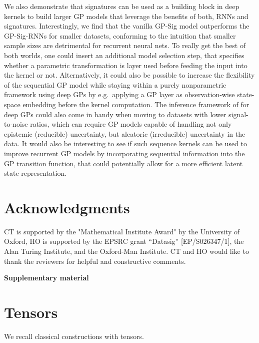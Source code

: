 \documentclass{article}
\begin{document}
We also demonstrate that signatures can be used as a building block in deep kernels to build larger GP models that leverage the benefits of both, RNNs and signatures. Interestingly, we find that the vanilla GP-Sig model outperforms the GP-Sig-RNNs for smaller datasets, conforming to the intuition that smaller sample sizes are detrimental for recurrent neural nets. To really get the best of both worlds, one could insert an additional model selection step, that specifies whether a parametric transformation is layer used before feeding the input into the kernel or not. Alternatively, it could also be possible to increase the flexibility of the sequential GP model while staying within a purely nonparametric framework using deep GPs \cite{damianou2013deep} by e.g.~applying a GP layer as observation-wise state-space embedding before the kernel computation. The inference framework of \cite{salimbeni19deep} for deep GPs could also come in handy when moving to datasets with lower signal-to-noise ratios, which can require GP models capable of handling not only epistemic (reducible) uncertainty, but aleatoric (irreducible) uncertainty in the data. It would also be interesting to see if such sequence kernels can be used to improve recurrent GP models \cite{Mattos2016Recurrent, Ialongo2019Overcoming} by incorporating sequential information into the GP transition function, that could potentially allow for a more efficient latent state representation.





	
	
\section*{Acknowledgments}
CT is supported by the "Mathematical Institute Award" by the University of Oxford, HO is supported by the EPSRC grant “Datasig” [EP/S026347/1], the Alan Turing Institute, and the Oxford-Man Institute.
CT and HO would like to thank the reviewers for helpful and constructive comments.





\appendix








	\newpage 
	\clearpage
	
    \textbf{\large Supplementary material}
	
	\section{Tensors} \label{app:tensors}
  We recall classical constructions with tensors.
\end{document}
